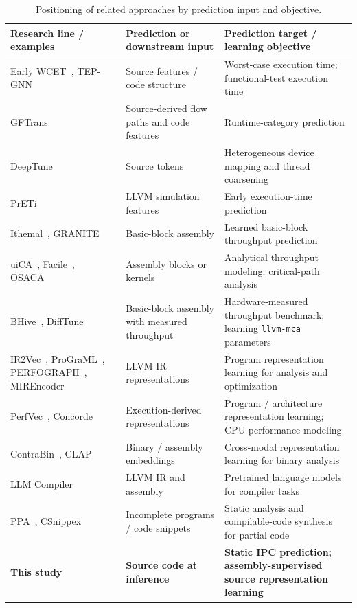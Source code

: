 \documentclass[conference]{IEEEtran}
\newcommand{\llvmmca}{\texttt{llvm-mca}}
\begin{document}
\begin{table}[t]
\caption{Positioning of related approaches by prediction input and objective.}
\label{tab:related}
\centering\small
\begin{tabular}{p{5.2cm}p{5.2cm}p{6.2cm}}
\toprule
Research line / examples & Prediction or downstream input & Prediction target / learning objective\\
\midrule
Early WCET~\cite{bonenfant2017wcet}, TEP-GNN~\cite{samoaa2022tep} & Source features / code structure & Worst-case execution time; functional-test execution time\\
GFTrans~\cite{li2026gftrans} & Source-derived flow paths and code features & Runtime-category prediction\\
DeepTune~\cite{cummins2017deeptune} & Source tokens & Heterogeneous device mapping and thread coarsening\\
PrETi~\cite{xu2025preti} & LLVM simulation features & Early execution-time prediction\\
Ithemal~\cite{mendis2019ithemal}, GRANITE~\cite{sykora2022granite} & Basic-block assembly & Learned basic-block throughput prediction\\
uiCA~\cite{abel2022uica}, Facile~\cite{abel2023facile}, OSACA~\cite{laukemann2019osaca} & Assembly blocks or kernels & Analytical throughput modeling; critical-path analysis\\
BHive~\cite{chen2019bhive}, DiffTune~\cite{renda2020difftune} & Basic-block assembly with measured throughput & Hardware-measured throughput benchmark; learning \llvmmca{} parameters\\
IR2Vec~\cite{ir2vec2020}, ProGraML~\cite{cummins2021programl}, PERFOGRAPH~\cite{tehranijamsaz2023perfograph}, MIREncoder~\cite{dutta2024mirencoder} & LLVM IR representations & Program representation learning for analysis and optimization\\
PerfVec~\cite{li2024perfvec}, Concorde~\cite{nasr2025concorde} & Execution-derived representations & Program / architecture representation learning; CPU performance modeling\\
ContraBin~\cite{zhang2022pre}, CLAP~\cite{wang2024clap} & Binary / assembly embeddings & Cross-modal representation learning for binary analysis\\
LLM Compiler~\cite{cummins2024llmcompiler} & LLVM IR and assembly & Pretrained language models for compiler tasks\\
PPA~\cite{dagenais2008partial}, CSnippex~\cite{terragni2016csnippex} & Incomplete programs / code snippets & Static analysis and compilable-code synthesis for partial code\\
\textbf{This study} & \textbf{Source code at inference} & \textbf{Static IPC prediction; assembly-supervised source representation learning}\\
\bottomrule
\end{tabular}
\end{table}
\end{document}

